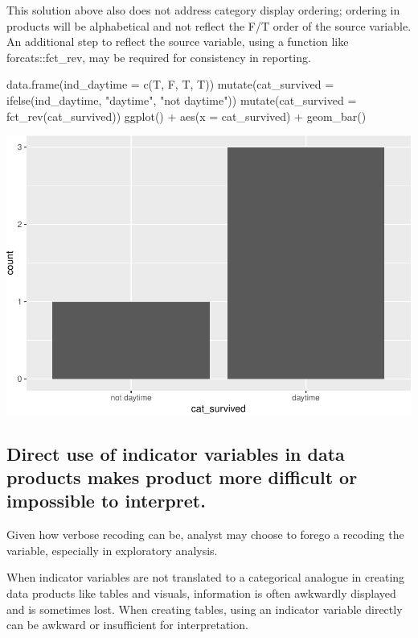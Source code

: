 This solution above also does not address category display ordering;
ordering in products will be alphabetical and not reflect the F/T order
of the source variable. An additional step to reflect the source
variable, using a function like forcats::fct\_rev, may be required for
consistency in reporting.

\begin{Schunk}
\begin{Sinput}
data.frame(ind_daytime = c(T, F, T, T)) %
    mutate(cat_survived = ifelse(ind_daytime, "daytime", "not daytime")) %
  mutate(cat_survived = fct_rev(cat_survived)) %
  ggplot() + 
  aes(x = cat_survived) + 
  geom_bar()
\end{Sinput}

\includegraphics[width=0.69\linewidth]{r_journal_files/figure-latex/unnamed-chunk-9-1} \end{Schunk}

\hypertarget{direct-use-of-indicator-variables-in-data-products-makes-product-more-difficult-or-impossible-to-interpret.}{%
\subsection{Direct use of indicator variables in data products makes
product more difficult or impossible to
interpret.}\label{direct-use-of-indicator-variables-in-data-products-makes-product-more-difficult-or-impossible-to-interpret.}}

Given how verbose recoding can be, analyst may choose to forego a
recoding the variable, especially in exploratory analysis.

When indicator variables are not translated to a categorical analogue in
creating data products like tables and visuals, information is often
awkwardly displayed and is sometimes lost. When creating tables, using
an indicator variable directly can be awkward or insufficient for
interpretation.

